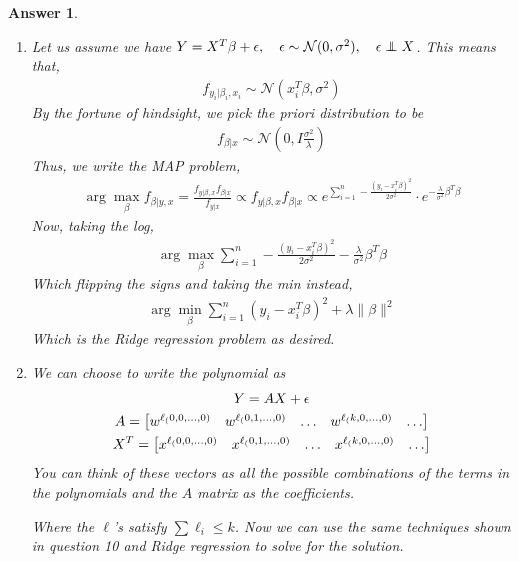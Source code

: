 \documentclass[12pt]{article}
\newcommand\independent{\protect\mathpalette{\protect\independenT}{\perp}}
\def\independenT#1#2{\mathrel{\rlap{$#1#2$}\mkern2mu{#1#2}}}
\theoremstyle{colon}
\newtheorem*{answer}{Answer}
\begin{document}
\begin{answer}
  \leavevmode
  \begin{enumerate}[label=\arabic*)]
    \item Let us assume we have $Y = X^T \beta + \epsilon, \quad \epsilon \sim \mathcal{N}(0, \sigma^2), \quad \epsilon \independent X$. This means that,
      \begin{gather*}
        f_{y_i | \beta_i, x_i} \sim \mathcal{N}(x_i^T \beta, \sigma^2)
      \end{gather*}
      By the fortune of hindsight, we pick the priori distribution to be
      \begin{gather*}
        f_{\beta | x} \sim \mathcal{N}(0, I \frac{\sigma^2}{\lambda})
      \end{gather*}
      Thus, we write the MAP problem,
      \begin{gather*}
        \arg\max_\beta f_{\beta | y,x} = \frac{f_{y | \beta, x}f_{\beta | x}}{f_{y|x}} \propto f_{y | \beta, x}f_{\beta | x} \propto e^{\sum_{i=1}^n -\frac{(y_i-x_i^T\beta)^2}{2\sigma^2}} \cdot e^{-\frac{\lambda}{\sigma^2}\beta^T\beta}
      \end{gather*}
      Now, taking the log,
      \begin{gather*}
        \arg\max_\beta \sum_{i=1}^n -\frac{(y_i-x_i^T\beta)^2}{2\sigma^2} -\frac{\lambda}{\sigma^2}\beta^T\beta
      \end{gather*}
      Which flipping the signs and taking the min instead,
      \begin{gather*}
        \arg\min_\beta \sum_{i=1}^n (y_i-x_i^T\beta)^2 + \lambda \rVert \beta \lVert^2
      \end{gather*}
      Which is the Ridge regression problem as desired.
    \item We can choose to write the polynomial as
      \begin{gather*}
        Y = AX + \epsilon \\
        A = \begin{bmatrix}
            w^{\ell_(0,0,\mathellipsis,0)} & w^{\ell_(0,1,\mathellipsis,0)} & \mathellipsis & w^{\ell_(k,0,\mathellipsis,0)} & \mathellipsis
        \end{bmatrix} \\
        X^T = \begin{bmatrix}
            x^{\ell_(0,0,\mathellipsis,0)} & x^{\ell_(0,1,\mathellipsis,0)} & \mathellipsis & x^{\ell_(k,0,\mathellipsis,0)} & \mathellipsis
        \end{bmatrix}
      \end{gather*}
      You can think of these vectors as all the possible combinations of the terms in the polynomials and the $A$ matrix as the coefficients.

      Where the $\ell$'s satisfy $\sum \ell_i \leq k$. Now we can use the same techniques shown in question 10 and Ridge regression to solve for the solution.
  \end{enumerate}
\end{answer}
\end{document}
